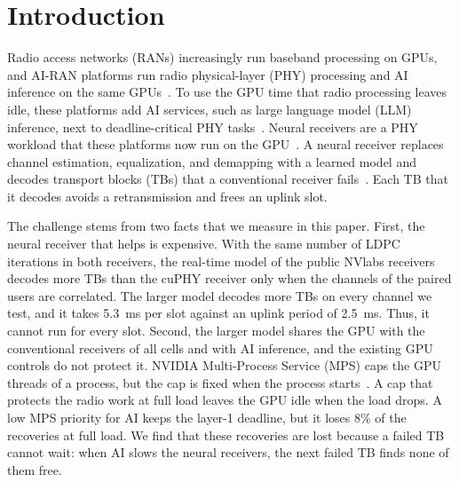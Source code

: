 \documentclass[acmsmall,screen,review,anonymous]{acmart}
\begin{document}
\maketitle

\section{Introduction}

Radio access networks (RANs) increasingly run baseband processing on GPUs, and AI-RAN platforms run radio
physical-layer (PHY) processing and AI inference on the same GPUs~\cite{aerial,yinyangran,interplay,distributedairan}.
To use the GPU time that radio processing leaves idle, these platforms add AI services, such as large
language model (LLM) inference, next to deadline-critical PHY tasks~\cite{caora,haf}. Neural receivers are a
PHY workload that these platforms now run on the GPU~\cite{aerial,nrxrt}. A neural receiver replaces channel estimation,
equalization, and demapping with a learned model and decodes transport blocks (TBs) that a conventional
receiver fails~\cite{deeprx,nrx5g,nrxrt}. Each TB that it decodes avoids a retransmission and frees an uplink
slot.

The challenge stems from two facts that we measure in this paper. First, the neural receiver that helps
is expensive. With the same number of LDPC iterations in both receivers, the real-time model of the public
NVlabs receivers~\cite{nrxrt,neuralrxsw} decodes more TBs than the cuPHY receiver only when the channels of
the paired users are correlated. The larger model decodes more TBs on every channel we test, and it takes
5.3~ms per slot against an uplink period of 2.5~ms. Thus, it cannot run for every slot. Second, the larger
model shares the GPU with the conventional receivers of all cells and with AI inference, and the existing
GPU controls do not protect it. NVIDIA Multi-Process Service (MPS) caps the GPU threads of a process, but
the cap is fixed when the process starts~\cite{nvidiampS}. A cap that protects the radio work at full load
leaves the GPU idle when the load drops. A low MPS priority for AI keeps the layer-1 deadline, but it loses
8\% of the recoveries at full load. We find that these recoveries are lost because a failed TB cannot wait:
when AI slows the neural receivers, the next failed TB finds none of them free.
\end{document}
